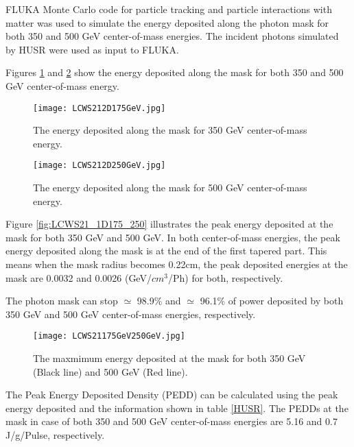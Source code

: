 \documentclass[a4paper]{article}
\begin{document}
FLUKA Monte Carlo code for particle tracking and particle interactions with matter \cite{fluka} was used to simulate the energy deposited along the photon mask for both 350 and 500 GeV center-of-mass energies. The incident photons simulated by HUSR were used as input to FLUKA. 

Figures \ref{fig:LCWS212D175} and \ref{fig:LCWS212D250} show the energy deposited along the mask for both 350 and 500 GeV center-of-mass energy. 





\begin{figure}[h]
\centering
\texttt{[image: LCWS212D175GeV.jpg]}
\caption{The energy deposited along the mask for 350 GeV center-of-mass energy.}
\label{fig:LCWS212D175}
\end{figure}




\begin{figure}[h]
\centering
\texttt{[image: LCWS212D250GeV.jpg]}
\caption{The energy deposited along the mask for 500 GeV center-of-mass energy.}
\label{fig:LCWS212D250}
\end{figure}


Figure \ref{fig:LCWS21_1D175_250} illustrates the peak energy deposited at the mask for both 350 GeV and 500 GeV. In both center-of-mass energies, the peak energy deposited along the mask is at the end of the first tapered part. This means when the mask radius becomes 0.22cm, the peak deposited energies at the mask are 0.0032 and 0.0026 (GeV/$cm^3$/Ph) for both, respectively.

The photon mask can stop $\simeq$ 98.9\% and $\simeq$ 96.1\% of power deposited by both 350 GeV and 500 GeV center-of-mass energies, respectively. 



\begin{figure}[h]
\centering
\texttt{[image: LCWS21175GeV250GeV.jpg]}
\caption{The maxmimum energy deposited at the mask for both 350 GeV (Black line) and 500 GeV (Red line).}
\label{fig:LCWS211D175250}
\end{figure}














The Peak Energy Deposited Density (PEDD) can be calculated using the peak energy deposited and the information shown in table \ref{HUSR}. The PEDDs at the mask in case of both 350 and 500 GeV center-of-mass energies are 5.16 and 0.7 J/g/Pulse, respectively. 
\end{document}
